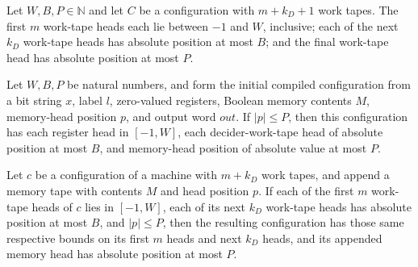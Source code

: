 \begin{definition}
\label{Complexity.LogProg.MBox}
\leanok
{}
Let $W,B,P\in\mathbb N$ and let $C$ be a configuration with $m+k_D+1$ work tapes. The
first $m$ work-tape heads each lie between $-1$ and $W$, inclusive; each of the next
$k_D$ work-tape heads has absolute position at most $B$; and the final work-tape head
has absolute position at most $P$.
\end{definition}

\begin{lemma}
\label{Complexity.LogProg.mbox_mseam}
\leanok
{}
Let $W,B,P$ be natural numbers, and form the initial compiled configuration from a bit
string $x$, label $l$, zero-valued registers, Boolean memory contents $M$, memory-head
position $p$, and output word $out$. If $|p|\le P$, then this configuration has each
register head in $[-1,W]$, each decider-work-tape head of absolute position at most $B$,
and memory-head position of absolute value at most $P$.
\end{lemma}

\begin{lemma}
\label{Complexity.LogProg.mbox_memCfg}
\leanok
{}
Let $c$ be a configuration of a machine with $m+k_D$ work tapes, and append a memory
tape with contents $M$ and head position $p$. If each of the first $m$ work-tape heads
of $c$ lies in $[-1,W]$, each of its next $k_D$ work-tape heads has absolute position at
most $B$, and $|p|\le P$, then the resulting configuration has those same respective
bounds on its first $m$ heads and next $k_D$ heads, and its appended memory head has
absolute position at most $P$.
\end{lemma}


